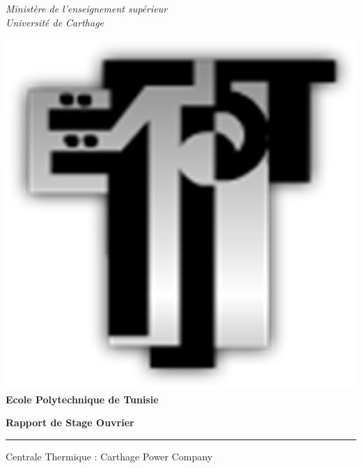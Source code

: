 \thispagestyle{empty}

\begin{center}
\small \emph{Ministère de l'enseignement supérieur\\
Université de Carthage\\[0.5cm]}

\includegraphics[scale=0.11]{./Figures/logo_EPT.eps}\\
\normalsize \textbf{Ecole Polytechnique de Tunisie}\\
\vspace{2cm}

\Large

 \textbf{Rapport de Stage Ouvrier}\\

\vspace{1cm}
\LARGE
\hrule
\vspace{2mm}

Centrale Thermique : Carthage Power Company



\end{center}

